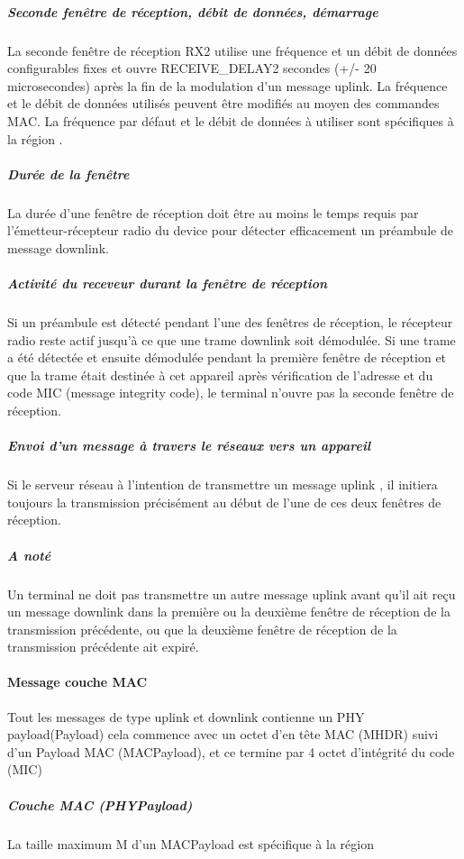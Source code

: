 \documentclass[11pt]{article}
\begin{document}
\subparagraph{Seconde fenêtre de réception, débit de données, démarrage}
La seconde fenêtre de réception RX2 utilise une fréquence et un débit de données configurables fixes et ouvre RECEIVE\_DELAY2 secondes (+/- 20 microsecondes) après la fin de la modulation d'un message uplink. La fréquence et le débit de données utilisés peuvent être modifiés au moyen des commandes MAC. La fréquence par défaut et le débit de données à utiliser sont spécifiques à la région .

\subparagraph{Durée de la fenêtre}

La durée d'une fenêtre de réception doit être au moins le temps requis par l'émetteur-récepteur radio du device pour détecter efficacement un préambule de message downlink.

\subparagraph{Activité du receveur durant la fenêtre de réception}

Si un préambule est détecté pendant l'une des fenêtres de réception, le récepteur radio reste actif jusqu'à ce que une trame downlink soit démodulée. Si une trame a été détectée et ensuite démodulée pendant la première fenêtre de réception et que la trame était destinée à cet appareil après vérification de l'adresse et du code MIC (message integrity code), le terminal n'ouvre pas la seconde fenêtre de réception.

\subparagraph{Envoi d'un message à travers le réseaux vers un appareil}

Si le serveur réseau à l'intention de transmettre un message uplink , il initiera toujours la transmission précisément au début de l'une de ces deux fenêtres de réception.
\subparagraph{A noté}

Un terminal ne doit pas transmettre un autre message uplink avant qu'il ait reçu un message downlink dans la première ou la deuxième fenêtre de réception de la transmission précédente, ou que la deuxième fenêtre de réception de la transmission précédente ait expiré.

\paragraph{Message couche MAC }
Tout les messages de type uplink et downlink contienne un PHY payload(Payload) cela commence avec un octet d'en tête MAC (MHDR) suivi d'un Payload MAC (MACPayload), et ce termine par 4 octet d'intégrité du code (MIC)

\subparagraph{Couche MAC (PHYPayload)}
La taille maximum M d'un MACPayload est spécifique à la région 
\end{document}

